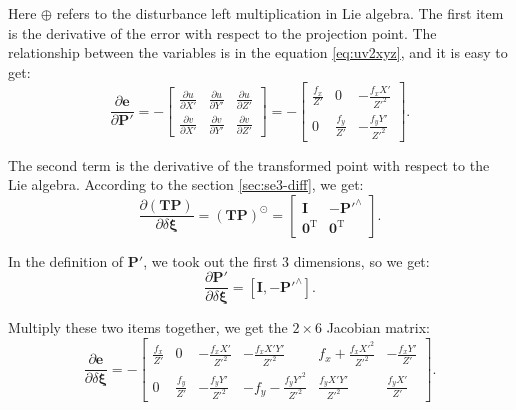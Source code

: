 Here $\oplus$ refers to the disturbance left multiplication in Lie algebra. The first item is the derivative of the error with respect to the projection point. The relationship between the variables is in the equation \eqref{eq:uv2xyz}, and it is easy to get:
\begin{equation}
\frac{{\partial \bm{e}}}{{\partial \bm{P}'}} = -\left[ 
{\begin{array}{*{20}{c}}
	{\frac{{\partial u}}{{\partial X'}}}&{\frac{{\partial u}}{{\partial Y'}}}&{\frac{{\partial u}}{{\partial Z'}}}\\
	{\frac{{\partial v}}{{\partial X'}}}&{\frac{{\partial v}}{{\partial Y'}}}&{\frac{{\partial v}}{{\partial Z'}}}
	\end{array}} \right] 
= - \left[ {\begin{array}{*{20}{c}}
	{\frac{{{f_x}}}{Z'}}&0&{ - \frac{{{f_x}X'}}{{{Z'^2}}}}\\
	0&{\frac{{{f_y}}}{Z'}}&{ - \frac{{{f_y}Y'}}{Z'^2}}
\end{array}} \right].
\end{equation}

The second term is the derivative of the transformed point with respect to the Lie algebra. According to the section \ref{sec:se3-diff}, we get:
\begin{equation}
\frac{{\partial \left( \bm{TP} \right)}}{{\partial \delta \boldsymbol{\xi} }} = {\left( \bm{TP} \right)^ \odot } = \left[ 
\begin{array}{*{20}{cc}}
\bm{I} &- \bm{P}'^ \wedge \\
\bm{0}^\mathrm{T} &\bm{0}^\mathrm{T} 
\end{array}
\right].
\end{equation}

In the definition of $\bm{P}'$, we took out the first 3 dimensions, so we get:
\begin{equation}
\frac{{\partial \bm{P}'}}{{\partial \delta \boldsymbol{\xi} }} = \left[ { \bm{I}, - {\bm{P}'^ \wedge }} \right].
\end{equation}

Multiply these two items together, we get the $2 \times 6$ Jacobian matrix:
\begin{equation}
\label{eq:jacob-uv2xi}
\frac{{\partial \bm{e}}}{{\partial \delta \boldsymbol{\xi} }} = - \left[ {\begin{array}{*{20}{c}}
	{\frac{{{f_x}}}{Z'}}&0&{ - \frac{{{f_x}X'}}{{{Z'^2}}}}&{ - \frac{{{f_x}X'Y'}}{{{Z'^2}}}}&{{f_x} + \frac{{{f_x}{X'^2}}}{{{Z'^2}}}}&{ - \frac{{{f_x}Y'}}{Z'}}\\
	0&{\frac{{{f_y}}}{Z'}}&{ - \frac{{{f_y}Y'}}{{{Z'^2}}}}&{ - {f_y} - \frac{{{f_y}{Y'^2}}}{{{Z'^2}}}}&{\frac{{{f_y}X'Y'}}{{{Z'^2}}}}&{\frac{{{f_y}X'}}{Z'}}
	\end{array}} \right].
\end{equation}

